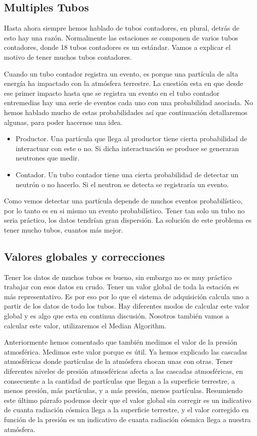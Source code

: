 	\subsection{Multiples Tubos}
		Hasta ahora siempre hemos hablado de tubos contadores, en plural, detrás de esto hay una razón. Normalmente las estaciones se componen de
		varios tubos contadores, donde 18 tubos contadores es un estándar. Vamos a explicar el motivo de tener muchos tubos contadores. 
		\par
		Cuando un tubo contador registra un evento, es porque una partícula de alta energía ha impactado con la atmósfera terrestre. La cuestión esta
		en que desde ese primer impacto hasta que se registra un evento en el tubo contador entremedias hay una serie de eventos cada uno con una
		probabilidad asociada. No hemos hablado mucho de estas probabilidades así que continuación detallaremos algunas, para poder hacernos una idea. 
		\begin{itemize}
			\item Productor. 	Una partícula que llega al productor tiene cierta probabilidad de interactuar con este o no. Si dicha
			  			interactuación se produce se generaran neutrones que medir.
			\item Contador. 	Un tubo contador tiene una cierta probabilidad de detectar un neutrón o no hacerlo. Si el neutron se detecta
			  			se registraría un evento.
		\end{itemize}
		Como vemos detectar una partícula depende de muchos eventos probabilístico, por lo tanto es en si mismo un evento probabilístico. Tener tan
		solo un tubo no seria práctico, los datos tendrían gran dispersión. La solución de este problema es tener mucho tubos, cuantos más mejor.
	\subsection{Valores globales y correcciones}
		Tener los datos de muchos tubos es bueno, sin embargo no es muy práctico trabajar con esos datos en crudo. Tener un valor global de toda la
		estación es más representativo. Es por eso por lo que el sistema de adquisición calcula uno a partir de los datos de todo los tubos. Hay 
		diferentes modos de calcular este valor global y es algo que esta en continua discusión. Nosotros también vamos a calcular este valor, 
		utilizaremos el Median Algorithm.
		\par
		Anteriormente hemos comentado que también medimos el valor de la presión atmosférica. Medimos este valor porque es útil. Ya hemos explicado
		las cascadas atmosféricas donde partículas de la atmósfera chocan unas con otras. Tener diferentes niveles de presión atmosféricas afecta a
		las cascadas atmosféricas, en consecuente a la cantidad de partículas que llegan a la superficie terrestre, a menos presión, más partículas,
		y a más presión, menos partículas. Resumiendo este último párrafo  podemos decir que el valor global sin corregir es un indicativo de cuanta
		radiación cósmica llega a la superficie terrestre, y el valor corregido en función de la presión es un indicativo de cuanta radiación cósmica
		llega a nuestra atmósfera.
